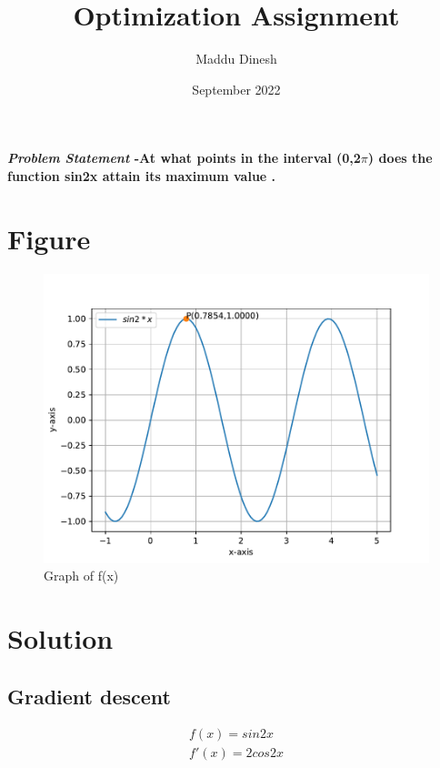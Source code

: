\documentclass[journal,10pt,twocolumn]{article}
\title{\textbf{Optimization Assignment}}
\author{Maddu Dinesh}
\date{September 2022}
\begin{document}
\maketitle
\paragraph{\textit{Problem Statement} -At what points in the interval (0,2$\pi$) does the function sin2x attain its maximum value .}

\section*{\large Figure}

\begin{figure}[H]
\centering
\includegraphics[width=1\columnwidth]{a.png}
\caption{Graph of f(x)}
\label{fig:triangle}
\end{figure}
\section*{\large Solution}

	
    \subsection*{\normalsize Gradient descent}
    
    
    \begin{align}
	\label{eq:vol_varx}
	f(x) = sin2x\\
    f'(x) = 2cos2x
	\end{align}
\end{document}
